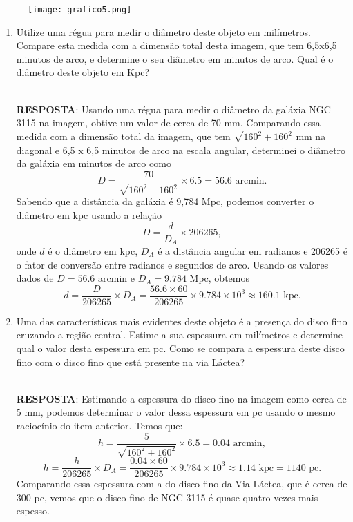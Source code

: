 \documentclass[a4paper,12pt]{article}
\begin{document}
\begin{enumerate}
\begin{figure}[H]
    \centering
    \texttt{[image: grafico5.png]}
\end{figure}

\begin{enumerate}
\item Utilize uma régua para medir o diâmetro deste objeto em milímetros. Compare esta medida com a dimensão total desta imagem, que tem 6,5x6,5 minutos de arco, e determine o seu diâmetro em minutos de arco. Qual é o diâmetro deste objeto em Kpc?

\noindent\hrulefill\\\textbf{RESPOSTA}: Usando uma régua para medir o diâmetro da galáxia NGC 3115 na imagem, obtive um valor de cerca de 70 mm. Comparando essa medida com a dimensão total da imagem, que tem $\sqrt{160^2 + 160^2}$ mm na diagonal e 6,5 x 6,5 minutos de arco na escala angular, determinei o diâmetro da galáxia em minutos de arco como
$$ D = \frac{70}{\sqrt{160^2 + 160^2}} \times 6.5 = 56.6 \text{ arcmin}. $$
Sabendo que a distância da galáxia é 9,784 Mpc, podemos converter o diâmetro em kpc usando a relação
$$ D = \frac{d}{D_A} \times 206265, $$
onde $d$ é o diâmetro em kpc, $D_A$ é a distância angular em radianos e 206265 é o fator de conversão entre radianos e segundos de arco. Usando os valores dados de $D=56.6$ arcmin e $D_A=9.784$ Mpc, obtemos
$$ d = \frac{D}{206265} \times D_A = \frac{56.6 \times 60}{206265} \times 9.784 \times 10^3 \approx 160.1 \text{ kpc}. $$

\noindent\hrulefill

\item Uma das características mais evidentes deste objeto é a presença do disco fino cruzando a região central. Estime a sua espessura em milímetros e determine qual o valor desta espessura em pc. Como se compara a espessura deste disco fino com o disco fino que está presente na via Láctea?

\noindent\hrulefill\\\textbf{RESPOSTA}: Estimando a espessura do disco fino na imagem como cerca de 5 mm, podemos determinar o valor dessa espessura em pc usando o mesmo raciocínio do item anterior. Temos que:
$$ h = \frac{5}{\sqrt{160^2 + 160^2}} \times 6.5 = 0.04 \text{ arcmin}, $$
$$ h = \frac{h}{206265} \times D_A = \frac{0.04 \times 60}{206265} \times 9.784 \times 10^3 \approx 1.14 \text{ kpc} = 1140 \text{ pc}. $$
Comparando essa espessura com a do disco fino da Via Láctea, que é cerca de 300 pc, vemos que o disco fino de NGC 3115 é quase quatro vezes mais espesso.


\end{enumerate}
\end{enumerate}
\end{document}

